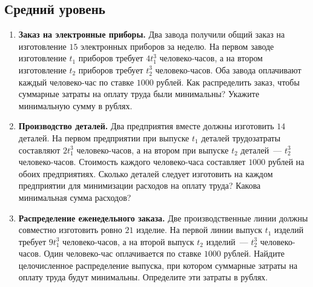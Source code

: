 \documentclass[a4paper,12pt]{article}
\begin{document}
\subsection*{Средний уровень}
\begin{enumerate}[label=\textbf{\arabic*.},start=4]
\item \textbf{Заказ на электронные приборы.} Два завода получили общий заказ на изготовление $15$ электронных приборов за неделю. На первом заводе изготовление $t_1$ приборов требует $4t_1^3$ человеко-часов, а на втором изготовление $t_2$ приборов требует $t_2^3$ человеко-часов. Оба завода оплачивают каждый человеко-час по ставке $1000$ рублей. Как распределить заказ, чтобы суммарные затраты на оплату труда были минимальны? Укажите минимальную сумму в рублях.

\item \textbf{Производство деталей.} Два предприятия вместе должны изготовить $14$ деталей. На первом предприятии при выпуске $t_1$ деталей трудозатраты составляют $2t_1^3$ человеко-часов, а на втором при выпуске $t_2$ деталей~--- $t_2^3$ человеко-часов. Стоимость каждого человеко-часа составляет $1000$ рублей на обоих предприятиях. Сколько деталей следует изготовить на каждом предприятии для минимизации расходов на оплату труда? Какова минимальная сумма расходов?

\item \textbf{Распределение еженедельного заказа.} Две производственные линии должны совместно изготовить ровно $21$ изделие. На первой линии выпуск $t_1$ изделий требует $9t_1^3$ человеко-часов, а на второй выпуск $t_2$ изделий~--- $t_2^3$ человеко-часов. Один человеко-час оплачивается по ставке $1000$ рублей. Найдите целочисленное распределение выпуска, при котором суммарные затраты на оплату труда будут минимальны. Определите эти затраты в рублях.
\end{enumerate}
\end{document}
